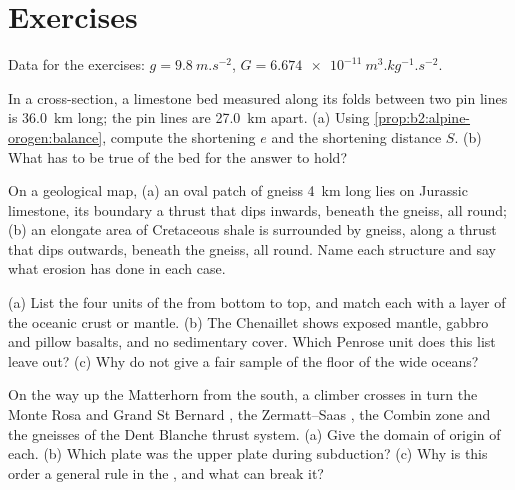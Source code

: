 \section*{Exercises}\label{sec:b2:alpine-orogen:exercises}

Data for the exercises: $g = \qty{9.8}{m.s^{-2}}$,
$G = \qty{6.674e-11}{m^3.kg^{-1}.s^{-2}}$.

\begin{exercise}[$\star$]\label{exo:b2:alpine-orogen:1}
In a cross-section, a limestone bed measured along its folds between two pin lines is
\qty{36.0}{km} long; the pin lines are \qty{27.0}{km} apart. (a) Using
\cref{prop:b2:alpine-orogen:balance}, compute the shortening $e$ and the shortening distance
$S$. (b) What has to be true of the bed for the answer to hold?
\end{exercise}

\begin{exercise}[$\star$]\label{exo:b2:alpine-orogen:2}
On a geological map, (a) an oval patch of gneiss \qty{4}{km} long lies on Jurassic
limestone, its boundary a thrust that dips inwards, beneath the gneiss, all round; (b) an
elongate area of Cretaceous shale is surrounded by gneiss, along a thrust that dips
outwards, beneath the gneiss, all round. Name each structure and say what erosion has done
in each case.
\end{exercise}

\begin{exercise}[$\star$]\label{exo:b2:alpine-orogen:3}
(a) List the four units of the  from bottom to top, and match each
with a layer of the oceanic crust or mantle. (b) The Chenaillet  shows exposed
mantle, gabbro and pillow basalts, and no sedimentary cover. Which Penrose unit does this
list leave out? (c) Why do  not give a fair sample of the floor of the wide
oceans?
\end{exercise}

\begin{exercise}[$\star$]\label{exo:b2:alpine-orogen:4}
On the way up the Matterhorn from the south, a climber crosses in turn the Monte Rosa and
Grand St Bernard , the Zermatt--Saas , the Combin zone and the gneisses of
the Dent Blanche thrust system. (a) Give the domain of origin of each. (b) Which plate was
the upper plate during subduction? (c) Why is this order a general rule in the ,
and what can break it?
\end{exercise}

